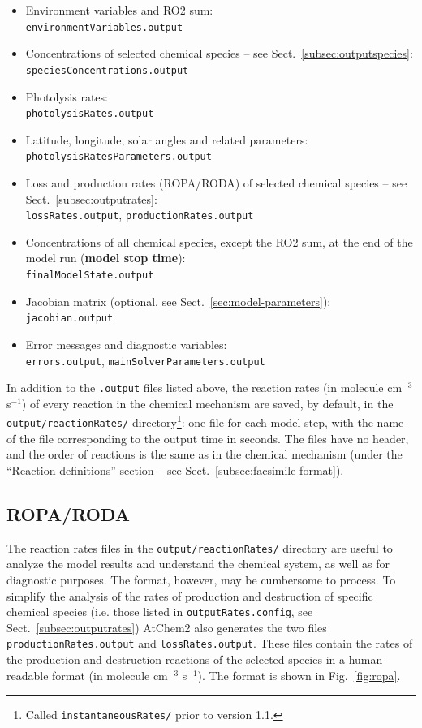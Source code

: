 \begin{itemize}
\item Environment variables and RO2 sum:\\
  \texttt{environmentVariables.output}
\item Concentrations of selected chemical species -- see
  Sect.~\ref{subsec:outputspecies}:\\
  \texttt{speciesConcentrations.output}
\item Photolysis rates:\\
  \texttt{photolysisRates.output}
\item Latitude, longitude, solar angles and related parameters:\\
  \texttt{photolysisRatesParameters.output}
\item Loss and production rates (ROPA/RODA) of selected chemical
  species -- see Sect.~\ref{subsec:outputrates}:\\
  \texttt{lossRates.output}, \texttt{productionRates.output}
\item Concentrations of all chemical species, except the RO2 sum,
  at the end of the model run (\textbf{model stop time}):\\
  \texttt{finalModelState.output}
\item Jacobian matrix (optional, see Sect.~\ref{sec:model-parameters}):\\
  \texttt{jacobian.output}
\item Error messages and diagnostic variables:\\
  \texttt{errors.output}, \texttt{mainSolverParameters.output}
\end{itemize}

In addition to the \texttt{.output} files listed above, the reaction rates (in molecule
cm$^{-3}$ s$^{-1}$) of every reaction in the chemical mechanism are saved, by default, in the
\texttt{output/reactionRates/} directory\footnote{Called \texttt{instantaneousRates/} prior to
  version 1.1.}: one file for each model step, with the name of the file corresponding to the
output time in seconds. The files have no header, and the order of reactions is the same as in
the chemical mechanism (under the ``Reaction definitions'' section -- see
Sect.~\ref{subsec:facsimile-format}).

\subsection{ROPA/RODA} \label{subsec:ropa-roda}

The reaction rates files in the \texttt{output/reactionRates/} directory are useful to analyze
the model results and understand the chemical system, as well as for diagnostic purposes. The
format, however, may be cumbersome to process. To simplify the analysis of the rates of
production and destruction of specific chemical species (i.e. those listed in
\texttt{outputRates.config}, see Sect.~\ref{subsec:outputrates}) AtChem2 also generates the two
files \texttt{productionRates.output} and \texttt{lossRates.output}. These files contain the
rates of the production and destruction reactions of the selected species in a human-readable
format (in molecule cm$^{-3}$ s$^{-1}$). The format is shown in Fig.~\ref{fig:ropa}.

